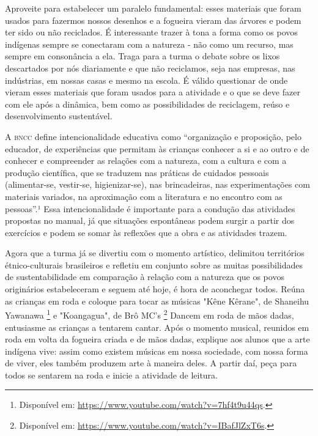 \documentclass[11pt]{extarticle}
\begin{document}
Aproveite para estabelecer um paralelo fundamental: esses materiais que foram usados para fazermos nossos desenhos e a fogueira vieram das árvores e podem ter sido ou não reciclados. É interessante trazer à tona a forma como os povos indígenas sempre se conectaram com a natureza - não como um recurso, mas sempre em consonância a ela. Traga para a turma o debate sobre os lixos descartados por nós diariamente e que não reciclamos, seja nas empresas, nas indústrias, em nossas casas e mesmo na escola. É válido questionar de onde vieram esses materiais que foram usados para a atividade e o que se deve fazer com ele após a dinâmica, bem como as possibilidades de reciclagem, reúso e desenvolvimento sustentável. 


A \textsc{bncc} define intencionalidade educativa como “organização e proposição, pelo educador, de experiências que permitam às crianças conhecer a si e ao outro e de conhecer e compreender as relações com a natureza, com a cultura e com a produção científica, que se traduzem nas práticas de cuidados pessoais (alimentar-se, vestir-se, higienizar-se), nas brincadeiras, nas experimentações com materiais variados, na aproximação com a literatura e no encontro com as pessoas”.¹ Essa intencionalidade é importante para a condução das atividades propostas no manual, já que situações espontâneas podem surgir a partir dos exercícios e podem se somar às reflexões que a obra e as atividades trazem.

Agora que a turma já se divertiu com o momento artístico, delimitou territórios étnico-culturais brasileiros e refletiu em conjunto sobre as muitas possibilidades de sustentabilidade em comparação à relação com a natureza que os povos originários estabeleceram e seguem até hoje, é hora de aconchegar todos. Reúna as crianças em roda e coloque para tocar as músicas  "Kêne Kêrane", de Shaneihu Yawanawa \footnote{Disponível em: \url{https://www.youtube.com/watch?v=7hf4t9u44qs}.} e "Koangagua", de Brô MC's \footnote{Disponível em: \url{https://www.youtube.com/watch?v=IBafJlZxT6s}.} Dancem em roda de mãos dadas, entusiasme as crianças a tentarem cantar. Após o momento musical, reunidos em roda em volta da fogueira criada e de mãos dadas, explique aos alunos que a arte indígena vive: assim como existem músicas em nossa sociedade, com nossa forma de viver, eles também produzem arte à maneira deles. A partir daí, peça para todos se sentarem na roda e inicie a atividade de leitura. 
\end{document}
